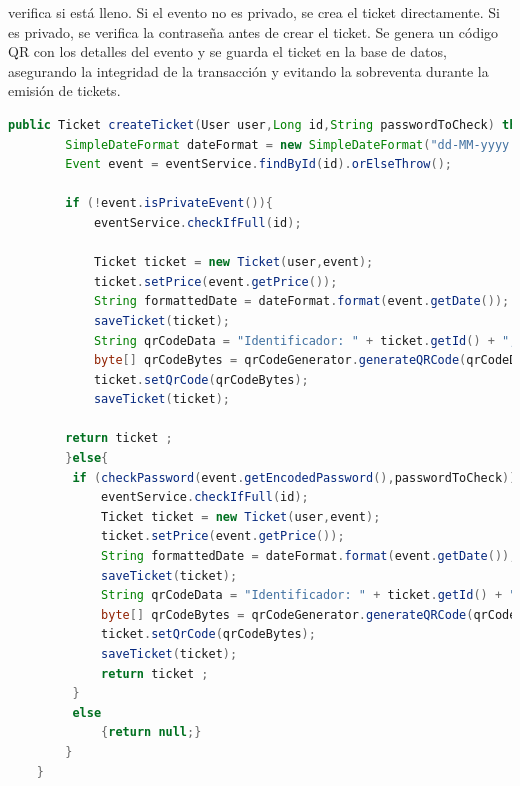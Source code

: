 verifica si está lleno. Si el evento no es privado, se crea el ticket directamente. Si es privado, se verifica la contraseña antes de crear el ticket. Se genera un código QR
con los detalles del evento y se guarda el ticket en la base de datos, asegurando la integridad de la transacción y evitando la sobreventa durante la emisión de tickets.
\myjavastyle
\begin{lstlisting}[language=Java, caption=Función createTicket, label=lst:servicioTicket]
    public Ticket createTicket(User user,Long id,String passwordToCheck) throws IOException, WriterException {
        SimpleDateFormat dateFormat = new SimpleDateFormat("dd-MM-yyyy HH:mm");
        Event event = eventService.findById(id).orElseThrow();

        if (!event.isPrivateEvent()){
            eventService.checkIfFull(id);

            Ticket ticket = new Ticket(user,event);
            ticket.setPrice(event.getPrice());
            String formattedDate = dateFormat.format(event.getDate());
            saveTicket(ticket);
            String qrCodeData = "Identificador: " + ticket.getId() + ", Nombre del Evento: " + event.getName() + ", Fecha del evento: "+ formattedDate;
            byte[] qrCodeBytes = qrCodeGenerator.generateQRCode(qrCodeData, 200, 200);
            ticket.setQrCode(qrCodeBytes);
            saveTicket(ticket);

        return ticket ;
        }else{
         if (checkPassword(event.getEncodedPassword(),passwordToCheck)){
             eventService.checkIfFull(id);
             Ticket ticket = new Ticket(user,event);
             ticket.setPrice(event.getPrice());
             String formattedDate = dateFormat.format(event.getDate());
             saveTicket(ticket);
             String qrCodeData = "Identificador: " + ticket.getId() + ", Nombre del Evento: " + event.getName() + ", Fecha del evento: "+ formattedDate;
             byte[] qrCodeBytes = qrCodeGenerator.generateQRCode(qrCodeData, 200, 200); // Ajusta el tamaño del QR según tus necesidades
             ticket.setQrCode(qrCodeBytes);
             saveTicket(ticket);
             return ticket ;
         }
         else
             {return null;}
        }
    }
\end{lstlisting}

